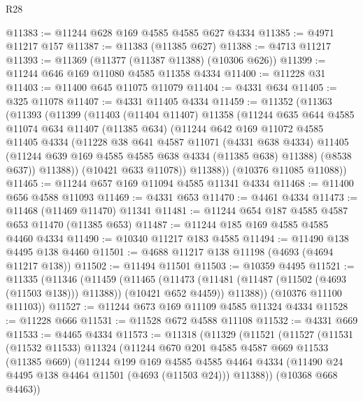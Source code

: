 \begin{lexlean}{R28}
\begin{coremodule}
@11383 := @11244 @628 @169 @4585 @4585 @627 @4334
@11385 := @4971 @11217 @157
@11387 := @11383 (@11385 @627)
@11388 := @4713 @11217
@11393 := @11369 (@11377 (@11387 @11388) (@10306 @626))
@11399 := @11244 @646 @169 @11080 @4585 @11358 @4334
@11400 := @11228 @31
@11403 := @11400 @645 @11075 @11079
@11404 := @4331 @634
@11405 := @325 @11078
@11407 := @4331 @11405 @4334
@11459 := @11352
    (@11363
      (@11393
        (@11399
          (@11403
            (@11404 @11407)
            @11358
            (@11244
              @635
              @644
              @4585
              @11074
              @634
              @11407
              (@11385 @634)
              (@11244
                @642
                @169
                @11072
                @4585
                @11405
                @4334
                (@11228
                  @38
                  @641
                  @4587
                  @11071
                  (@4331 @638 @4334)
                  @11405
                  (@11244 @639 @169 @4585 @4585 @638 @4334 (@11385 @638) @11388)
                  (@8538 @637))
                @11388))
            (@10421 @633 @11078))
          @11388))
      (@10376 @11085 @11088))
@11465 := @11244 @657 @169 @11094 @4585 @11341 @4334
@11468 := @11400 @656 @4588 @11093
@11469 := @4331 @653
@11470 := @4461 @4334
@11473 := @11468 (@11469 @11470) @11341
@11481 := @11244 @654 @187 @4585 @4587 @653 @11470 (@11385 @653)
@11487 := @11244 @185 @169 @4585 @4585 @4460 @4334
@11490 := @10340 @11217 @183 @4585
@11494 := @11490 @138 @4495 @138 @4460
@11501 := @4688 @11217 @138 @11198 (@4693 (@4694 @11217 @138))
@11502 := @11494 @11501
@11503 := @10359 @4495
@11521 := @11335
    (@11346
      (@11459
        (@11465
          (@11473 (@11481 (@11487 (@11502 (@4693 (@11503 @138))) @11388)) (@10421 @652 @4459))
          @11388))
      (@10376 @11100 @11103))
@11527 := @11244 @673 @169 @11109 @4585 @11324 @4334
@11528 := @11228 @666
@11531 := @11528 @672 @4588 @11108
@11532 := @4331 @669
@11533 := @4465 @4334
@11573 := @11318
    (@11329
      (@11521
        (@11527
          (@11531
            (@11532 @11533)
            @11324
            (@11244
              @670
              @201
              @4585
              @4587
              @669
              @11533
              (@11385 @669)
              (@11244
                @199
                @169
                @4585
                @4585
                @4464
                @4334
                (@11490 @24 @4495 @138 @4464 @11501 (@4693 (@11503 @24)))
                @11388))
            (@10368 @668 @4463))

\end{coremodule}
\end{lexlean}
